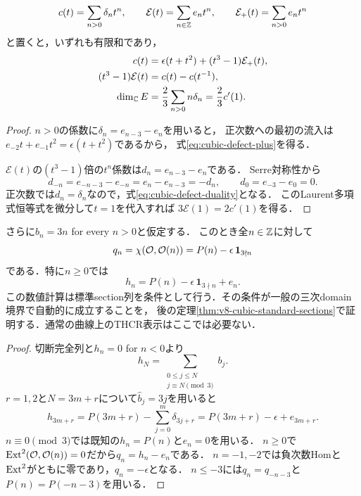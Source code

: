 \documentclass[11pt,a4paper]{ltjsarticle}
\begin{document}
\begin{proposition}[欠損多項式とExtのLaurent多項式]\label{prop:cubic-defect-polynomial}
\[
 c(t)=\sum_{n>0}\delta_nt^n,
 \qquad \mathcal E(t)=\sum_{n\in\mathbb Z}e_nt^n,
 \qquad \mathcal E_+(t)=\sum_{n>0}e_nt^n
\]
と置くと，いずれも有限和であり，
\begin{align}
 c(t)&=\epsilon(t+t^2)+(t^3-1)\mathcal E_+(t),\label{eq:cubic-defect-plus}\\
 (t^3-1)\mathcal E(t)&=c(t)-c(t^{-1}),\label{eq:cubic-defect-duality}\\
 \dim_\mathbb C E&=\frac23\sum_{n>0}n\delta_n=\frac23c'(1).
 \label{eq:cubic-defect-moment}
\end{align}
\end{proposition}
\begin{proof}
$n>0$の係数に$\delta_n=e_{n-3}-e_n$を用いると，
正次数への最初の流入は$e_{-2}t+e_{-1}t^2=\epsilon(t+t^2)$であるから，
式\eqref{eq:cubic-defect-plus}を得る．

$\mathcal E(t)$の$(t^3-1)$倍の$t^n$係数は$d_n=e_{n-3}-e_n$である．
Serre対称性から
\[
 d_{-n}=e_{-n-3}-e_{-n}=e_n-e_{n-3}=-d_n,
 \qquad d_0=e_{-3}-e_0=0.
\]
正次数では$d_n=\delta_n$なので，式\eqref{eq:cubic-defect-duality}となる．
このLaurent多項式恒等式を微分して$t=1$を代入すれば
$3\mathcal E(1)=2c'(1)$を得る．
\end{proof}

\begin{corollary}[飽和後のHilbert列が標準の場合のEuler列]\label{cor:cubic-standard-saturation-euler}
さらに$\widehat b_n=3n$ for every $n>0$と仮定する．
このとき全$n\in\mathbb Z$に対して
\begin{equation}\label{eq:cubic-period-three-euler}
 q_n=\chi(\mathcal O,\mathcal O(n))
 =P(n)-\epsilon\,\mathbf1_{3\nmid n}
\end{equation}
である．特に$n\geq0$では
\[
 h_n=P(n)-\epsilon\,\mathbf1_{3\nmid n}+e_n.
\]
この数値計算は標準section列を条件として行う．その条件が一般の三次domain境界で自動的に成立することを，
後の定理\ref{thm:v8-cubic-standard-sections}で証明する．通常の曲線上のTHCR表示はここでは必要ない．
\end{corollary}
\begin{proof}
切断完全列と$h_n=0$ for $n<0$より
\[
 h_N=\sum_{\substack{0\leq j\leq N\\j\equiv N\pmod3}}b_j.
\]
$r=1,2$と$N=3m+r$について$\widehat b_j=3j$を用いると
\[
 h_{3m+r}
 =P(3m+r)-\sum_{j=0}^m\delta_{3j+r}
 =P(3m+r)-\epsilon+e_{3m+r}.
\]
$n\equiv0\pmod3$では既知の$h_n=P(n)$と$e_n=0$を用いる．
$n\geq0$で$\operatorname{Ext}^2(\mathcal O,\mathcal O(n))=0$だから$q_n=h_n-e_n$である．
$n=-1,-2$では負次数Homと$\operatorname{Ext}^2$がともに零であり，$q_n=-\epsilon$となる．
$n\leq-3$には$q_n=q_{-n-3}$と$P(n)=P(-n-3)$を用いる．
\end{proof}
\end{document}
